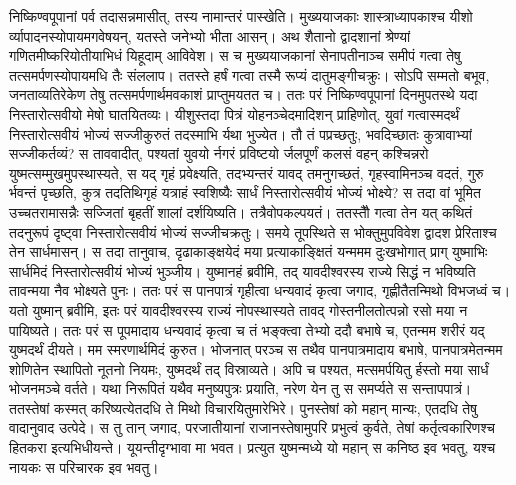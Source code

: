 \adhyAya
{}
\vakya निष्किण्वपूपानां पर्व तदासन्नमासीत्, तस्य नामान्तरं पास्खेति।
\vakya मुख्ययाजकाः शास्त्राध्यापकाश्च यीशो र्व्यापादनस्योपायमगवेषयन्, यतस्ते जनेभ्यो भीता आसन्।
\vakya अथ शैतानो द्वादशानां श्रेण्यां गणितमीष्करियोतीयाभिधं यिहूदाम् आविवेश।
\vakya स च मुख्ययाजकानां सेनापतीनाञ्च समीपं गत्वा तेषु तत्समर्पणस्योपायमधि तैः संललाप।
\vakya ततस्ते हर्षं गत्वा तस्मै रूप्यं दातुमङ्गीचक्रुः।
\vakya सोऽपि सम्मतो बभूव, जनताव्यतिरेकेण तेषु तत्समर्पणार्थमवकाशं प्राप्तुमयतत च।
\vakya ततः परं निष्किण्वपूपानां दिनमुपतस्थे यदा निस्तारोत्सवीयो मेषो घातयितव्यः।
\vakya यीशुस्तदा पित्रं योहनञ्चेदमादिशन् प्राहिणोत्, युवां गत्वास्मदर्थं निस्तारोत्सवीयं भोज्यं सज्जीकुरुतं तदस्माभि र्यथा भुज्येत।
\vakya तौ तं पप्रच्छतुः, भवदिच्छातः कुत्रावाभ्यां सज्जीकर्तव्यं?
\vakya स ताववादीत्, पश्यतां युवयो र्नगरं प्रविष्टयो र्जलपूर्णं कलसं वहन् कश्चिन्नरो युष्मत्सम्मुखमुपस्थास्यते, स यद् गृहं प्रवेक्ष्यति, तदभ्यन्तरं यावद् तमनुगच्छतं,
\vakya गृहस्वामिनञ्च वदतं, गुरु र्भवन्तं पृच्छति, कुत्र तदतिथिगृहं यत्राहं स्वशिष्यैः सार्धं निस्तारोत्सवीयं भोज्यं भोक्ष्ये?
\vakya स तदा वां भूमित उच्चतरामासन्नैः सज्जितां बृहतीं शालां दर्शयिष्यति। तत्रैवोपकल्पयतं।
\vakya ततस्तौै गत्वा तेन यत् कथितं तदनुरूपं दृष्ट्वा निस्तारोत्सवीयं भोज्यं सज्जीचक्रतुः।
\vakya समये तूपस्थिते स भोक्तुमुपविवेश द्वादश प्रेरिताश्च तेन सार्धमासन्।
\vakya स तदा तानुवाच, दृढाकाङ्क्षयेदं मया प्रत्याकाङ्क्षितं यन्ममम दुःखभोगात् प्राग् युष्माभिः सार्धमिदं निस्तारोत्सवीयं भोज्यं भुञ्जीय।
\vakya युष्मानहं ब्रवीमि, तद् यावदीश्वरस्य राज्ये सिद्धं न भविष्यति तावन्मया नैव भोक्ष्यते पुनः।
\vakya ततः परं स पानपात्रं गृहीत्वा धन्यवादं कृत्वा जगाद, गृह्णीतैतन्मिथो विभजध्वं च।
\vakya यतो युष्मान् ब्रवीमि, इतः परं यावदीश्वरस्य राज्यं नोपस्थास्यते तावद् गोस्तनीलतोत्पन्नो रसो मया न पायिष्यते।
\vakya ततः परं स पूपमादाय धन्यवादं कृत्वा च तं भङ्क्त्वा तेभ्यो ददौ बभाषे च, एतन्मम शरीरं यद् युष्मदर्थं दीयते। मम स्मरणार्थमिदं कुरुत।
\vakya भोजनात् परञ्च स तथैव पानपात्रमादाय बभाषे, पानपात्रमेतन्मम शोणितेन स्थापितो नूतनो नियमः, युष्मदर्थं तद् विस्राव्यते।
\vakya अपि च पश्यत, मत्समर्पयितु र्हस्तो मया सार्धं भोजनमञ्चे वर्तते।
\vakya यथा निरूपितं यथैव मनुष्यपुत्रः प्रयाति, नरेण येन तु स समर्प्यते स सन्तापपात्रं।
\vakya ततस्तेषां कस्मत् करिष्यत्येतदधि ते मिथो विचारयितुमारेभिरे।
\vakya पुनस्तेषां को महान् मान्यः, एतदधि तेषु वादानुवाद उत्पेदे।
\vakya स तु तान् जगाद, परजातीयानां राजानस्तेषामुपरि प्रभुत्वं कुर्वते, तेषां कर्तृत्वकारिणश्च हितकरा इत्यभिधीयन्ते।
\vakya यूयन्तीदृग्भावा मा भवत। प्रत्युत युष्मन्मध्ये यो महान् स कनिष्ठ इव भवतु, यश्च नायकः स परिचारक इव भवतु।
